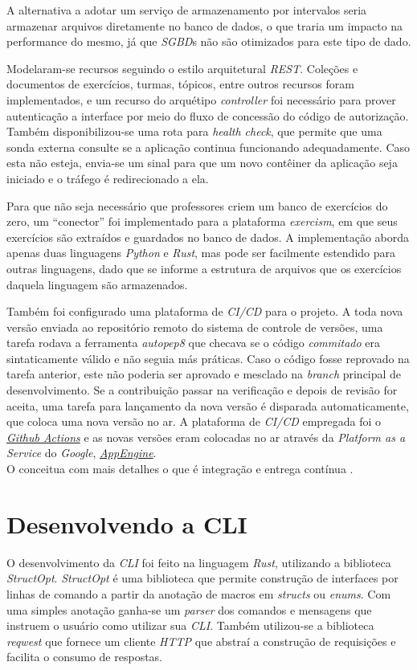 A alternativa a adotar um serviço de armazenamento por intervalos seria armazenar arquivos 
diretamente no banco de dados, o que traria um impacto na performance do mesmo, já que \emph{SGBD}s não são otimizados para
este tipo de dado. 

Modelaram-se recursos seguindo o estilo arquitetural \emph{REST}. Coleções e documentos
de exercícios, turmas, tópicos, entre outros recursos foram implementados, e um 
recurso do arquétipo \emph{controller} foi necessário para prover autenticação a interface por 
meio do fluxo de concessão do código de autorização. Também disponibilizou-se uma rota para \emph{health check}, 
que permite que uma sonda externa consulte se a aplicação continua funcionando adequadamente. Caso esta não esteja, 
envia-se um sinal para que um novo contêiner da aplicação seja iniciado e o tráfego é redirecionado a ela. 

Para que não seja necessário que professores criem um banco de exercícios do zero, um ``conector'' foi 
implementado para a plataforma \emph{exercism}, em que seus exercícios são extraídos e guardados no banco 
de dados. A implementação aborda apenas duas linguagens \emph{Python} e \emph{Rust}, mas 
pode ser facilmente estendido para outras linguagens, dado que se informe a estrutura de arquivos 
que os exercícios daquela linguagem são armazenados.

Também foi configurado uma plataforma de \emph{CI/CD} para o projeto. A toda nova versão enviada 
ao repositório remoto do sistema de controle de versões, uma tarefa rodava a ferramenta \emph{autopep8}
que checava se o código \emph{commitado} era sintaticamente válido e não seguia más práticas. 
Caso o código fosse reprovado na tarefa anterior, este não poderia ser aprovado e mesclado 
na \emph{branch} principal de desenvolvimento. Se a contribuição passar na verificação e 
depois de revisão for aceita, uma tarefa para lançamento da nova versão é disparada automaticamente, 
       que coloca uma nova versão no ar. A plataforma de \emph{CI/CD} empregada foi o 
       \hyperref[link:actions]{\emph{Github Actions}} e 
       as novas versões eram colocadas no ar através da \emph{Platform as a Service} do \emph{Google}, 
       \hyperref[link:appengine]{\emph{AppEngine}}.  \\ 
       O  conceitua com mais detalhes o que é integração e  entrega contínua .



\section{Desenvolvendo a CLI}
O desenvolvimento da \emph{CLI} foi feito na linguagem \emph{Rust}, utilizando 
a biblioteca \emph{StructOpt}.  \emph{StructOpt} é uma biblioteca que permite construção 
de interfaces por linhas de comando a partir da anotação de macros em \emph{structs} ou 
\emph{enums}. Com uma simples anotação ganha-se um \emph{parser} dos comandos e mensagens 
que instruem o usuário como utilizar sua \emph{CLI}. Também utilizou-se a biblioteca \emph{reqwest} que fornece um cliente \emph{HTTP} que abstraí
a construção de requisições e facilita o consumo de respostas.

